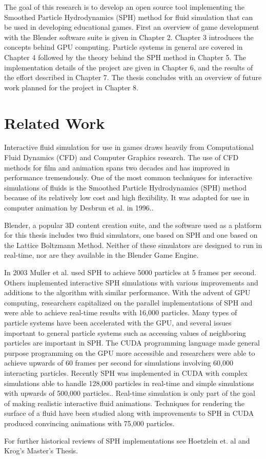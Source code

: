 The goal of this research is to develop an open source tool implementing the
Smoothed Particle Hydrodynamics (SPH) method for fluid simulation that can be
used in developing educational games. First an overview of game development
with the Blender software suite is given in Chapter 2.  
Chapter 3 introduces the concepts behind GPU computing. Particle systems in
general are covered in Chapter 4 followed by the theory behind the SPH method
in Chapter 5. The implementation details of the project are given in Chapter 6,
and the results of the effort described in Chapter 7. The thesis concludes with
an overview of future work planned for the project in Chapter 8. 


\section{Related Work}

Interactive fluid simulation for use in games draws heavily from Computational
Fluid Dynamics (CFD) and Computer Graphics research. The use of CFD methods for
film and animation spans two decades\cite{Tan2009} and has improved in
performance tremendously. One of the most common techniques for interactive
simulations of fluids is the Smoothed Particle Hydrodynamics (SPH) method
because of its relatively low cost and high flexibility. It was adapted for use
in computer animation by Desbrun et al. in 1996.\cite{Desbrun1996}. 


Blender, a popular 3D content creation suite, and the software used as a
platform for this thesis includes two fluid simulators, one based on SPH\cite{Clavet2005} and
one based on the Lattice Boltzmann Method\cite{Nils2006}. Neither of these simulators are
designed to run in real-time, nor are they available in the Blender Game
Engine. 


In 2003 Muller et al. used SPH to achieve 5000 particles at 5 frames per
second\cite{Muller2003}.  Others implemented interactive SPH simulations with
various improvements and additions to the algorithm with similar
performance.\cite{Kallin2009}\cite{Kelager2006}
With the advent of GPU computing, researchers capitalized on the parallel
implementations of SPH and were able to achieve real-time results with 16,000 particles.\cite{Harada2007a}
Many types of particle systems have been accelerated with the GPU, and several issues
important to general particle systems such as accessing values of neighboring
particles are important in SPH.\cite{Knowles2009}
The CUDA programming language made general purpose programming on the GPU more
accessible and researchers were able to achieve upwards of 60 frames per second
for simulations involving 60,000 interacting particles.\cite{Seizinger2010}
Recently SPH was implemented in CUDA with complex simulations able to handle
128,000 particles in real-time and simple simulations with upwards of 500,000
particles.\cite{Krog2010}. Real-time simulation is only part of the goal of making
realistic interactive fluid animations. Techniques for rendering the
surface of a fluid have been studied along with improvements to SPH in CUDA 
produced convincing animations with 75,000 particles.\cite{Goswami2010} 


For further historical reviews of SPH implementations see Hoetzlein et.
al\cite{Hoetzlein} and Krog's Master's Thesis.\cite{Krog2010}



